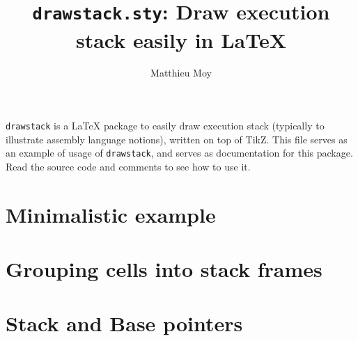 \documentclass{article}
\title{{\tt drawstack.sty}: Draw execution stack easily in LaTeX}
\author{Matthieu Moy}
\begin{document}
\maketitle

{\tt drawstack} is a LaTeX package to easily draw execution stack
(typically to illustrate assembly language notions), written on top of
TikZ. This file serves as an example of usage of {\tt drawstack}, and
serves as documentation for this package. Read the source code and
comments to see how to use it.

\section{Minimalistic example}

\begin{drawstack}
\end{drawstack}

\section{Grouping cells into stack frames}

\begin{drawstack}
  \startframe
  \startframe
\end{drawstack}

\section{Stack and Base pointers}

\begin{drawstack}
  \startframe
   
   
   \esp \ebp
   
  \startframe
  \cell{} 
  \cell{}
\end{drawstack}
\end{document}
